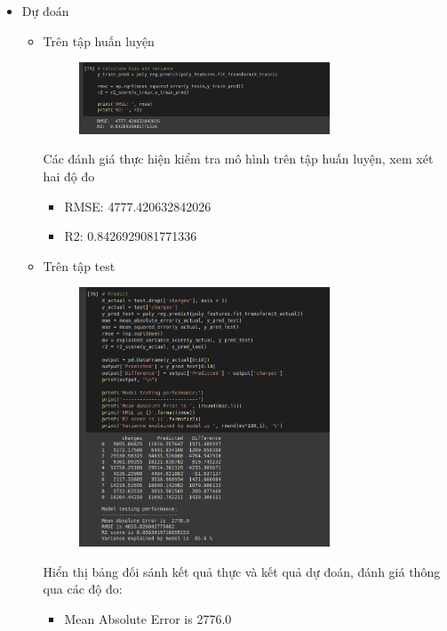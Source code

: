 \documentclass{article}
\begin{document}
\begin{itemize}
\begin{figure}[H]
		\end{figure}
		\item Dự đoán
		\begin{itemize}
			\item Trên tập huấn luyện
			\begin{figure}[H]
				\centering
				\includegraphics[width=0.75\textwidth]{images/polynomial_reg/poly_predict_train_set.png}
			\end{figure}
			Các đánh giá thực hiện kiểm tra mô hình trên tập huấn luyện, xem xét hai độ đo
			\begin{itemize}
				\item RMSE:  4777.420632842026
				\item R2:  0.8426929081771336
			\end{itemize}
			\item Trên tập test
			\begin{figure}[H]
				\centering
				\includegraphics[width=0.75\textwidth]{images/polynomial_reg/poly_predict_test_evaluation.png}
			\end{figure}
			Hiển thị bảng đối sánh kết quả thực và kết quả dự đoán, đánh giá thông qua các độ đo:
			\begin{itemize}
				\item Mean Absolute Error is  2776.0

\end{itemize}
\end{itemize}
\end{itemize}
\end{document}
